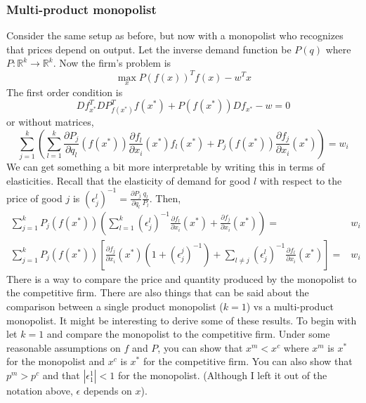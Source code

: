 \documentclass[12pt,reqno]{amsart}
\theoremstyle{definition}
\def\R{\mathbb{R}}
\renewcommand{\to}{{\rightarrow}}
\begin{document}
\subsubsection{Multi-product monopolist}
Consider the same setup as before, but now with a monopolist who
recognizes that prices depend on output. Let the inverse demand
function be $P(q)$ where $P:\R^k \to \R^k$. Now the firm's problem
is 
\[ \max_x P(f(x))^T f(x) - w^T x \]
The first order condition is
\[ Df_{x^*}^T DP_{f(x^*)}^T f(x^*) + P(f(x^*)) Df_{x^*} - w = 0 \]
or without matrices,
\[ \sum_{j=1}^k \left( \sum_{l=1}^k \frac{\partial P_j}{\partial q_l}(f(x^*))
  \frac{\partial f_l}{\partial x_i}(x^*) f_l(x^*) + 
  P_j(f(x^*)) \frac{\partial f_j}{\partial x_i}(x^*) \right)
= w_i \]
We can get something a bit more interpretable by writing this in terms
of elasticities. Recall that the elasticity of demand for good $l$
with respect to the price of good $j$ is $(\epsilon^l_j)^{-1}=
\frac{\partial P_j}{\partial q_l} \frac{q_l}{P_l}$. Then,
\begin{align*}
  \sum_{j=1}^k P_j(f(x^*)) \left(\sum_{l=1}^k (\epsilon^l_j)^{-1} \frac{\partial
      f_l}{\partial x_i}(x^*) +  \frac{\partial f_j}{\partial x_i}(x^*) \right)
  = & w_i \\
  \sum_{j=1}^k P_j(f(x^*)) \left[\frac{\partial f_j}{\partial x_i}(x^*)
    \left(1 + (\epsilon_j^j)^{-1} \right) + \sum_{l \neq j}
  (\epsilon_j^l)^{-1} \frac{\partial f_l}{\partial x_i}(x^*) \right] = & w_i 
\end{align*}
There is a way to compare the price and quantity produced by the
monopolist to the competitive firm. There are also things that can be
said about the comparison between a single product monopolist ($k=1$)
vs a multi-product monopolist. It might be interesting to derive some
of these results. To begin with let $k = 1$ and compare the monopolist
to the competitive firm. Under some reasonable assumptions on $f$ and
$P$, you can show that $x^m < x^c$ where $x^m$ is $x^*$ for the
monopolist and $x^c$ is $x^*$ for the competitive firm. You can also
show that $p^m>p^c$ and that $|\epsilon^1_1| < 1$ for the
monopolist. (Although I left it out of the notation above, $\epsilon$
depends on $x$). 
\end{document}
